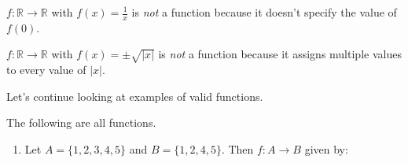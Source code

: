 \documentclass[a4paper]{scrartcl}
\begin{document}
\begin{example}
	$f: \mathbb{R} \rightarrow \mathbb{R}$ with $f(x) = \frac{1}{x}$ is \emph{not} a function because it doesn't specify the value of $f(0)$.

	$f: \mathbb{R} \rightarrow \mathbb{R}$ with $f(x) = \pm \sqrt{|x|}$ is \emph{not} a function because it assigns multiple values to every value of $|x|$.
\end{example}


Let's continue looking at examples of valid functions.

\begin{example}
	The following are all functions.
	\begin{enumerate}[label=(\roman*)]
		\item Let $A = \{1, 2, 3, 4, 5\}$ and $B = \{1, 2, 4, 5\}$. Then $f: A \rightarrow B$ given by:
		\begin{center}
			


\begin{tikzpicture}[x=0.75pt,y=0.75pt,yscale=-1,xscale=1]


\end{tikzpicture}
\end{center}
\end{enumerate}
\end{example}
\end{document}
